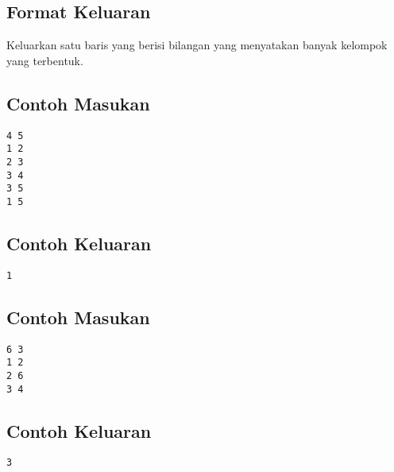 \documentclass{article}
\begin{document}
\subsection*{Format Keluaran}

Keluarkan satu baris yang berisi bilangan yang menyatakan banyak kelompok yang terbentuk.

\newline
\begin{multicols}{2}
\subsection*{Contoh Masukan}
\begin{lstlisting}
4 5
1 2
2 3
3 4
3 5
1 5
\end{lstlisting}
\columnbreak
\subsection*{Contoh Keluaran}
\begin{lstlisting}
1
\end{lstlisting}
\vfill
\null
\end{multicols}

\begin{multicols}{2}
\subsection*{Contoh Masukan}
\begin{lstlisting}
6 3
1 2
2 6
3 4
\end{lstlisting}
\columnbreak
\subsection*{Contoh Keluaran}
\begin{lstlisting}
3
\end{lstlisting}
\vfill
\null
\end{multicols}


\pagebreak
\end{document}
